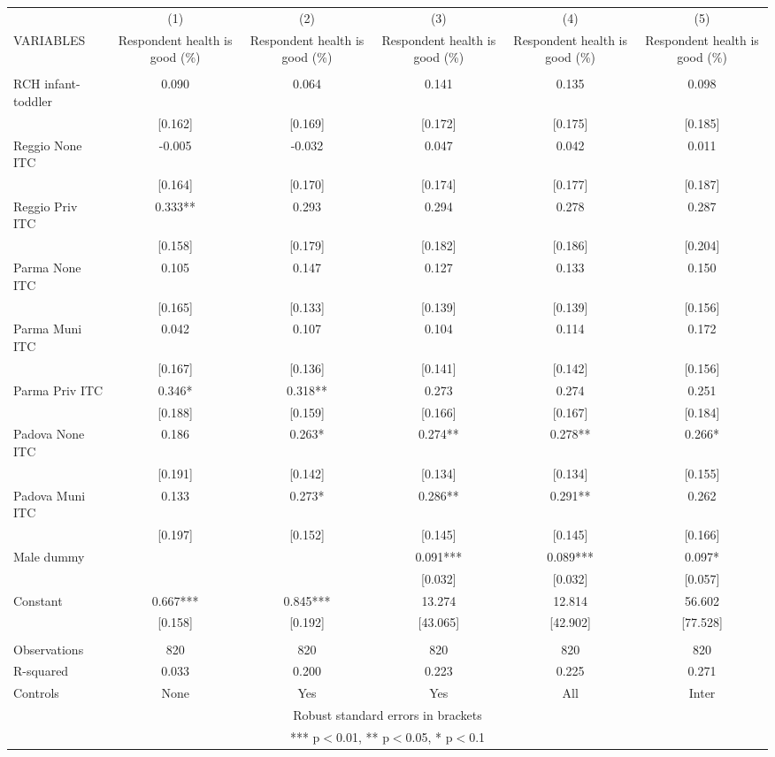 \begin{tabular}{lccccc} \hline
 & (1) & (2) & (3) & (4) & (5) \\
VARIABLES & Respondent health is good (\%) & Respondent health is good (\%) & Respondent health is good (\%) & Respondent health is good (\%) & Respondent health is good (\%) \\ \hline
 &  &  &  &  &  \\
RCH infant-toddler & 0.090 & 0.064 & 0.141 & 0.135 & 0.098 \\
 & [0.162] & [0.169] & [0.172] & [0.175] & [0.185] \\
Reggio None ITC & -0.005 & -0.032 & 0.047 & 0.042 & 0.011 \\
 & [0.164] & [0.170] & [0.174] & [0.177] & [0.187] \\
Reggio Priv ITC & 0.333** & 0.293 & 0.294 & 0.278 & 0.287 \\
 & [0.158] & [0.179] & [0.182] & [0.186] & [0.204] \\
Parma None ITC & 0.105 & 0.147 & 0.127 & 0.133 & 0.150 \\
 & [0.165] & [0.133] & [0.139] & [0.139] & [0.156] \\
Parma Muni ITC & 0.042 & 0.107 & 0.104 & 0.114 & 0.172 \\
 & [0.167] & [0.136] & [0.141] & [0.142] & [0.156] \\
Parma Priv ITC & 0.346* & 0.318** & 0.273 & 0.274 & 0.251 \\
 & [0.188] & [0.159] & [0.166] & [0.167] & [0.184] \\
Padova None ITC & 0.186 & 0.263* & 0.274** & 0.278** & 0.266* \\
 & [0.191] & [0.142] & [0.134] & [0.134] & [0.155] \\
Padova Muni ITC & 0.133 & 0.273* & 0.286** & 0.291** & 0.262 \\
 & [0.197] & [0.152] & [0.145] & [0.145] & [0.166] \\
Male dummy &  &  & 0.091*** & 0.089*** & 0.097* \\
 &  &  & [0.032] & [0.032] & [0.057] \\
Constant & 0.667*** & 0.845*** & 13.274 & 12.814 & 56.602 \\
 & [0.158] & [0.192] & [43.065] & [42.902] & [77.528] \\
 &  &  &  &  &  \\
Observations & 820 & 820 & 820 & 820 & 820 \\
R-squared & 0.033 & 0.200 & 0.223 & 0.225 & 0.271 \\
 Controls & None & Yes & Yes & All & Inter \\ \hline
\multicolumn{6}{c}{ Robust standard errors in brackets} \\
\multicolumn{6}{c}{ *** p$<$0.01, ** p$<$0.05, * p$<$0.1} \\
\end{tabular}
